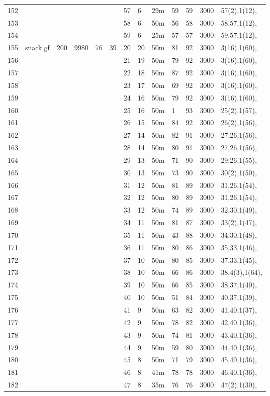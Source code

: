 \documentclass{article}
\begin{document}
\begin{longtable}{|l |l |l |l |l |l |l |l |l |l |l |l |l |}
152&&&&&&57&6&29m&59&59&3000&57(2),1(12),\\
153&&&&&&58&6&50m&56&58&3000&58,57,1(12),\\
154&&&&&&59&6&25m&57&57&3000&59,57,1(12),\\
155&snack.gf&200&9980&76&39&20&20&50m&81&92&3000&3(16),1(60),\\
156&&&&&&21&19&50m&79&92&3000&3(16),1(60),\\
157&&&&&&22&18&50m&87&92&3000&3(16),1(60),\\
158&&&&&&23&17&50m&69&92&3000&3(16),1(60),\\
159&&&&&&24&16&50m&79&92&3000&3(16),1(60),\\
160&&&&&&25&16&50m&1&93&3000&25(2),1(57),\\
161&&&&&&26&15&50m&84&92&3000&26(2),1(56),\\
162&&&&&&27&14&50m&82&91&3000&27,26,1(56),\\
163&&&&&&28&14&50m&80&91&3000&27,26,1(56),\\
164&&&&&&29&13&50m&71&90&3000&29,26,1(55),\\
165&&&&&&30&13&50m&73&90&3000&30(2),1(50),\\
166&&&&&&31&12&50m&81&89&3000&31,26,1(54),\\
167&&&&&&32&12&50m&80&89&3000&31,26,1(54),\\
168&&&&&&33&12&50m&74&89&3000&32,30,1(49),\\
169&&&&&&34&11&50m&81&87&3000&33(2),1(47),\\
170&&&&&&35&11&50m&43&88&3000&34,30,1(48),\\
171&&&&&&36&11&50m&80&86&3000&35,33,1(46),\\
172&&&&&&37&10&50m&80&85&3000&37,33,1(45),\\
173&&&&&&38&10&50m&66&86&3000&38,4(3),1(64),\\
174&&&&&&39&10&50m&66&85&3000&38,37,1(40),\\
175&&&&&&40&10&50m&51&84&3000&40,37,1(39),\\
176&&&&&&41&9&50m&63&82&3000&41,40,1(37),\\
177&&&&&&42&9&50m&78&82&3000&42,40,1(36),\\
178&&&&&&43&9&50m&74&81&3000&43,40,1(36),\\
179&&&&&&44&9&50m&59&80&3000&44,40,1(36),\\
180&&&&&&45&8&50m&71&79&3000&45,40,1(36),\\
181&&&&&&46&8&41m&78&78&3000&46,40,1(36),\\
182&&&&&&47&8&35m&76&76&3000&47(2),1(30),\\

\end{longtable}
\end{document}
